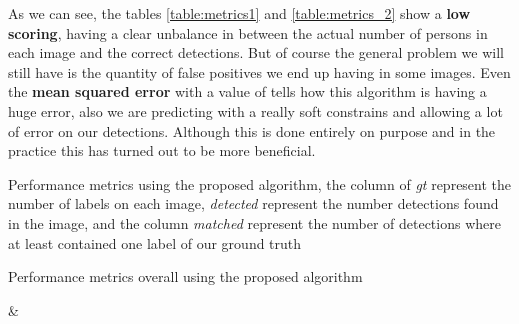 \documentclass[10pt]{article}
\begin{document}


As we can see, the tables \ref{table:metrics1} and \ref{table:metrics_2} show a \textbf{low scoring}, having a clear unbalance in between the actual number of persons in each image and the correct detections. But of course the general problem we will still have is the quantity of false positives we end up having in some images. Even the \textbf{mean squared error} with a value of  tells how this algorithm is having a huge error, also we are predicting with a really soft constrains and allowing a lot of error on our detections. Although this is done entirely on purpose and in the practice this has turned out to be more beneficial.\medskip

\begin{table} [h]
  \centering
  \caption[Performance metrics Basic]{Performance metrics using the proposed algorithm, the column of \textit{gt} represent the number of labels on each image, \textit{detected} represent the number detections found in the image, and the column \textit{matched} represent the number of detections where at least contained one label of our ground truth}\label{table:metrics1}
\end{table}

\begin{table} [h]
  \centering
  \caption[Performance metrics overall]{Performance metrics overall using the proposed algorithm}\label{table:metrics_2}

  {\csvcoli & \csvcolii}%
\end{table}
\end{document}
